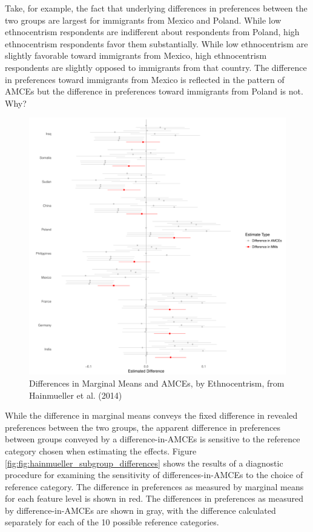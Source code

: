 \documentclass[a4paper,12pt]{article}\usepackage[]{graphicx}\usepackage[]{color}
\makeatletter
\def\maxwidth{ %
  \ifdim\Gin@nat@width>\linewidth
    \linewidth
  \else
    \Gin@nat@width
  \fi
}
\newenvironment{knitrout}{}{} %
\makeatother
\begin{document}
Take, for example, the fact that underlying differences in preferences between the two groups are largest for immigrants from Mexico and Poland. While low ethnocentrism respondents are indifferent about respondents from Poland, high ethnocentrism respondents favor them substantially. While low ethnocentrism are slightly favorable toward immigrants from Mexico, high ethnocentrism respondents are slightly opposed to immigrants from that country. The difference in preferences toward immigrants from Mexico is reflected in the pattern of AMCEs but the difference in preferences toward immigrants from Poland is not. Why?

\begin{knitrout}
\color{fgcolor}\begin{figure}
\includegraphics[width=\maxwidth]{figure/hainmueller_subgroup_differences-1} \caption[Differences in Marginal Means and AMCEs, by Ethnocentrism, from Hainmueller et al]{Differences in Marginal Means and AMCEs, by Ethnocentrism, from Hainmueller et al. (2014)}\label{fig:hainmueller_subgroup_differences}
\end{figure}


\end{knitrout}

While the difference in marginal means conveys the fixed difference in revealed preferences between the two groups, the apparent difference in preferences between groups conveyed by a difference-in-AMCEs is sensitive to the reference category chosen when estimating the effects. Figure \ref{fig:fig:hainmueller_subgroup_differences} shows the results of a diagnostic procedure for examining the sensitivity of differences-in-AMCEs to the choice of reference category. The difference in preferences as measured by marginal means for each feature level is shown in red. The differences in preferences as measured by difference-in-AMCEs are shown in gray, with the difference calculated separately for each of the 10 possible reference categories.
\end{document}

